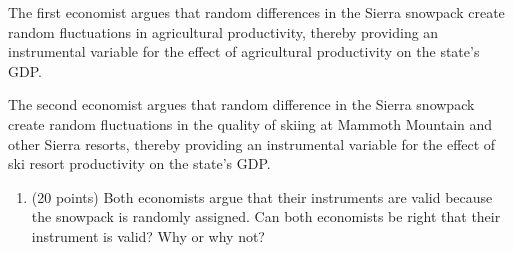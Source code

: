 \documentclass[10pt]{article}
\begin{document}
The first economist argues that random differences in the Sierra snowpack create random fluctuations in agricultural productivity, thereby providing an instrumental variable for the effect of agricultural productivity on the state's GDP.

The second economist argues that random difference in the Sierra snowpack create random fluctuations in the quality of skiing at Mammoth Mountain and other Sierra resorts, thereby providing an instrumental variable for the effect of ski resort productivity on the state's GDP.

\begin{enumerate}
\item (20 points) Both economists argue that their instruments are valid because the snowpack is randomly assigned. Can both economists be right that their instrument is valid? Why or why not?
\end{enumerate}
\end{document}
